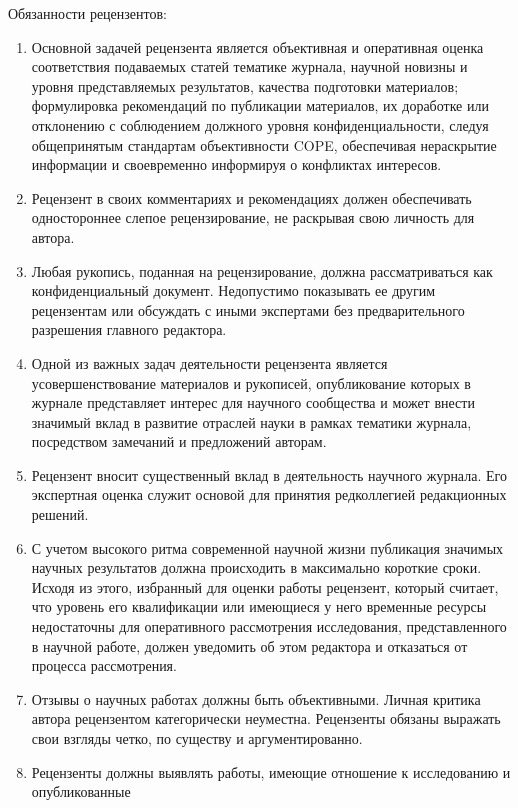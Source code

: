 \documentclass[10pt,a4paper]{book}
\begin{document}
Обязанности рецензентов:
\begin{enumerate}[itemsep=0pt,parsep=2pt,topsep=2pt,partopsep=0pt]
\item Основной задачей рецензента является объективная и оперативная оценка соответствия
      подаваемых статей тематике журнала, научной новизны и уровня представляемых
      результатов, качества подготовки материалов; формулировка рекомендаций по публикации
      материалов, их доработке или отклонению с соблюдением должного уровня
      конфиденциальности, следуя общепринятым стандартам объективности COPE, обеспечивая
      нераскрытие информации и своевременно информируя о конфликтах интересов.
\item Рецензент в своих комментариях и рекомендациях должен обеспечивать одностороннее
      слепое рецензирование, не раскрывая свою личность для автора.
\item Любая рукопись, поданная на рецензирование, должна рассматриваться как
      конфиденциальный документ. Недопустимо показывать ее другим рецензентам или
      обсуждать с иными экспертами без предварительного разрешения главного редактора.
\item Одной из важных задач деятельности рецензента является усовершенствование материалов
      и рукописей, опубликование которых в журнале представляет интерес для научного
      сообщества и может внести значимый вклад в развитие отраслей науки в рамках тематики
      журнала, посредством замечаний и предложений авторам.
\item Рецензент вносит существенный вклад в деятельность научного журнала. Его экспертная
      оценка служит основой для принятия редколлегией редакционных решений.
\item С учетом высокого ритма современной научной жизни публикация значимых научных
      результатов должна происходить в максимально короткие сроки. Исходя из этого,
      избранный для оценки работы рецензент, который считает, что уровень его квалификации
      или имеющиеся у него временные ресурсы недостаточны для оперативного рассмотрения
      исследования, представленного в научной работе, должен уведомить об этом редактора и
      отказаться от процесса рассмотрения.
\item Отзывы о научных работах должны быть объективными. Личная критика автора рецензентом
      категорически неуместна. Рецензенты обязаны выражать свои взгляды четко, по существу
      и аргументированно.
\item Рецензенты должны выявлять работы, имеющие отношение к исследованию и опубликованные

\end{enumerate}
\end{document}
